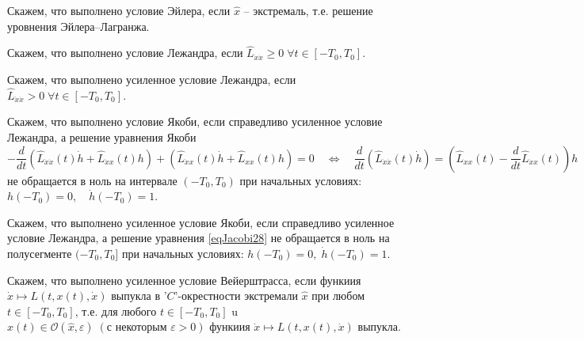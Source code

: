 \begin{task}

    \begin{definition}
        Скажем, что выполнено условие Эйлера, если $\widehat x$ -- экстремаль, т.е. решение уровнения Эйлера--Лагранжа.
    \end{definition}

    \begin{definition}
        Скажем, что выполнено условие Лежандра,
        если $\widehat L_{\dot{x}\dot{x}} \geq 0 \; \forall t \in [-T_0, T_0]$.
    \end{definition}

    \begin{definition}
        Скажем, что выполнено усиленное условие Лежандра,
        если $\widehat L_{\dot{x}\dot{x}} > 0 \; \forall t \in [-T_0, T_0]$.
    \end{definition}

    \begin{definition} Скажем, что выполнено условие Якоби,
        если справедливо усиленное условие Лежандра, а решение уравнения Якоби
        \begin{equation} \label{eqJacobi28}
            -\frac{d}{d t}\left(\widehat{L}_{\dot{x} \dot{x}}(t) \dot{h}
            +\widehat{L}_{\dot{x} x}(t) h\right)
            +\left(\widehat{L}_{\dot{x} x}(t) \dot{h}
            +\widehat{L}_{x x}(t) h\right)=0 \quad
            \Leftrightarrow \quad \frac{d}{d t}\left(\widehat{L}_{\dot{x} \dot{x}}(t) \dot{h}\right)
            =\left(\widehat{L}_{x x}(t)-\frac{d}{d t} \widehat{L}_{\dot{x} x}(t)\right) h
        \end{equation}
        не обращается в ноль на интервале $\left(-T_0, T_0\right)$ при начальных условиях:
        $h\left(-T_0\right)=0, \quad \dot{h}\left(-T_0\right)=1$.
    \end{definition}
    \begin{definition}
        Скажем, что выполнено усиленное условие Якоби, если справедливо усиленное условие
        Лежандра, а решение уравнения \eqref{eqJacobi28} не обращается в ноль на полусегменте
        $(-T_0, T_0]$ при начальных условиях: ${h(-T_0)=0, \; \dot{h}(-T_0)=1}$.
    \end{definition}

    \begin{definition}
        Скажем, что выполнено усиленное условие Вейерштрасса,
        если функиия $\dot{x} \mapsto L(t, x(t), \dot{x})$
        выпукла в '$C$'-окрестности экстремали $\widehat{x}$
        при любом $t \in\left[-T_0, T_0\right]$, т.е. для любого
        $t \in\left[-T_0, T_0\right]$ u $x(t) \in
            \mathcal{O}(\widehat{x}, \varepsilon) \;
            (\text {с некоторым } {\varepsilon>0})$ функиия
        $\dot{x} \mapsto L(t, x(t), \dot{x})$ выпукла.
    \end{definition}


\end{task}
